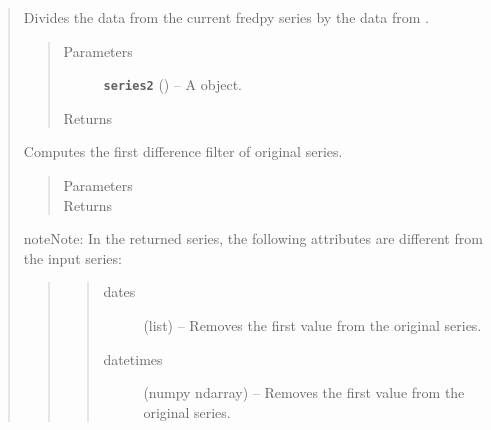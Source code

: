 \documentclass[letterpaper,10pt,english]{sphinxmanual}
\begin{document}
\begin{fulllineitems}
\begin{quote}
\begin{fulllineitems}
\label{series_class:fredpy.series.divide}
Divides the data from the current fredpy series by the data from .
\begin{quote}\begin{description}
\item[{Parameters}] \leavevmode
\textbf{\texttt{series2}} ({\hyperref[series_class:fredpy.series]{}}) -- A  object.

\item[{Returns}] \leavevmode
{\hyperref[series_class:fredpy.series]{}}

\end{description}\end{quote}

\end{fulllineitems}


\begin{fulllineitems}
\label{series_class:fredpy.series.firstdiff}
Computes the first difference filter of original series.
\begin{quote}\begin{description}
\item[{Parameters}] \leavevmode
\item[{Returns}] \leavevmode
{\hyperref[series_class:fredpy.series]{}}

\end{description}\end{quote}

\begin{notice}{note}{Note:}
In the returned series, the following attributes are different from the input series:
\begin{quote}
\begin{quote}\begin{description}
\item[{dates}] \leavevmode
(list) --  Removes the first value from the original series.

\item[{datetimes}] \leavevmode
(numpy ndarray) --  Removes the first value from the original series.


\end{description}
\end{quote}
\end{quote}
\end{notice}
\end{fulllineitems}
\end{quote}
\end{fulllineitems}
\end{document}
